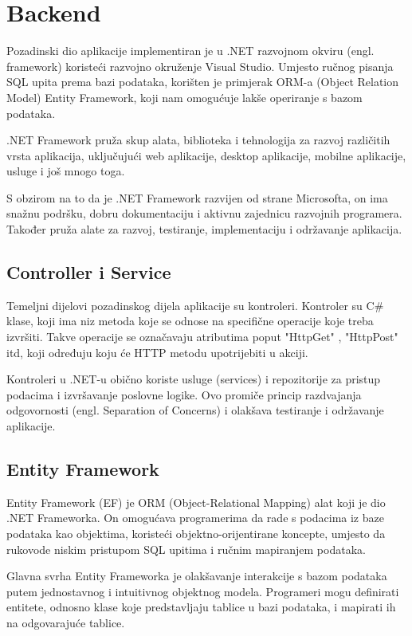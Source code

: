 \documentclass[times, utf8, zavrsni]{fer}
\begin{document}
\section{Backend}
Pozadinski dio aplikacije implementiran je u .NET razvojnom okviru (engl. framework) koristeći razvojno okruženje Visual Studio. Umjesto ručnog pisanja SQL upita prema bazi podataka,  \cite{dotnet}
korišten je primjerak ORM-a (Object Relation Model) Entity Framework, koji nam omogućuje lakše operiranje s bazom podataka.

.NET Framework pruža skup alata, biblioteka i tehnologija za razvoj različitih vrsta aplikacija, uključujući web aplikacije, desktop aplikacije, mobilne aplikacije, usluge i još mnogo toga.

S obzirom na to da je .NET Framework razvijen od strane Microsofta, on ima snažnu podršku, dobru dokumentaciju i aktivnu zajednicu razvojnih programera. Također pruža alate za razvoj, testiranje, implementaciju i održavanje aplikacija.

\subsection{Controller i Service}
Temeljni dijelovi pozadinskog dijela aplikacije su kontroleri. Kontroler su C\# klase, koji ima niz metoda  koje se odnose na specifične operacije koje treba izvršiti.
Takve operacije se označavaju atributima poput "HttpGet" , "HttpPost" itd, koji određuju koju će HTTP metodu upotrijebiti u akciji.

Kontroleri u .NET-u obično koriste usluge (services) i repozitorije za pristup podacima i izvršavanje poslovne logike. Ovo promiče princip razdvajanja odgovornosti (engl. Separation of Concerns) i olakšava testiranje i održavanje aplikacije. 

\subsection{Entity Framework}
Entity Framework (EF) je ORM (Object-Relational Mapping) alat koji je dio .NET Frameworka. On omogućava programerima da rade s podacima iz baze podataka kao objektima, koristeći objektno-orijentirane koncepte, umjesto da rukovode niskim pristupom  SQL upitima i ručnim mapiranjem podataka. \cite{ef}

Glavna svrha Entity Frameworka je olakšavanje interakcije s bazom podataka putem jednostavnog i intuitivnog objektnog modela. Programeri mogu definirati entitete, odnosno klase koje predstavljaju tablice u bazi podataka, i mapirati ih na odgovarajuće tablice.
\end{document}
